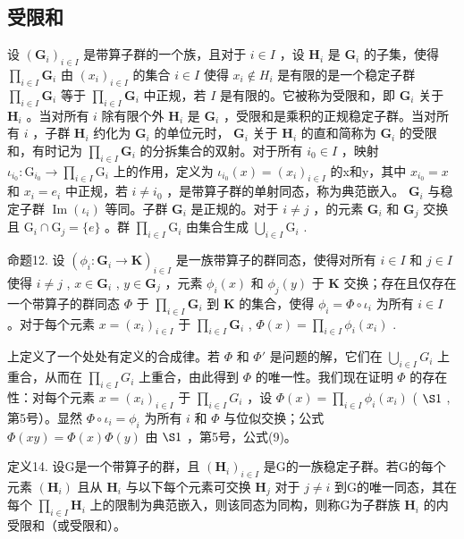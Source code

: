 \subsection{受限和}

设 \((\mathbf{G}_i)_{i\in I}\) 是带算子群的一个族，且对于 \(i\in I\) ，设 \(\mathbf{H}_i\) 是 \(\mathbf{G}_i\) 的子集，使得 \(\prod_{i\in I}\mathbf{G}_i\) 由 \((x_i)_{i\in I}\) 的集合 \(i\in I\) 使得 \(x_i\notin H_i\) 是有限的是一个稳定子群 \(\prod_{i\in I}\mathbf{G}_i\) 等于 \(\prod_{i\in I}\mathbf{G}_i\) 中正规，若 \(I\) 是有限的。它被称为受限和，即 \(\mathbf{G}_i\) 关于 \(\mathbf{H}_i\) 。当对所有 \(i\) 除有限个外 \(\mathbf{H}_i\) 是 \(\mathbf{G}_i\) ，受限和是乘积的正规稳定子群。当对所有 \(i\) ，子群 \(\mathbf{H}_i\) 约化为 \(\mathbf{G}_i\) 的单位元时， \(\mathbf{G}_i\) 关于 \(\mathbf{H}_i\) 的直和简称为 \(\mathbf{G}_i\) 的受限和，有时记为 \(\prod_{i\in I}\mathbf{G}_i\) 的分拆集合的双射。对于所有 \(i_0\in I\) ，映射 \(\iota_{i_0}:\mathrm{G}_{i_0}\to \prod_{i\in I}\mathrm{G}_i\) 上的作用，定义为 \(\iota_{i_0}(x) = (x_i)_{i\in I}\) 的x和y，其中 \(x_{i_0} = x\) 和 \(x_i = e_i\) 中正规，若 \(i\neq i_0\) ，是带算子群的单射同态，称为典范嵌入。 \(\mathbf{G}_i\) 与稳定子群 \(\operatorname {Im}(\iota_i)\) 等同。子群 \(\mathbf{G}_i\) 是正规的。对于 \(i\neq j\) ，的元素 \(\mathbf{G}_i\) 和 \(\mathbf{G}_j\) 交换且 \(\mathrm{G}_i\cap \mathrm{G}_j = \{e\}\) 。群 \(\prod_{i\in I}\mathrm{G}_i\) 由集合生成 \(\bigcup_{i\in I}\mathrm{G}_i\) .

命题12. 设 \((\phi_i: \mathbf{G}_i \to \mathbf{K})_{i \in I}\) 是一族带算子的群同态，使得对所有 \(i \in I\) 和 \(j \in I\) 使得 \(i \neq j\) , \(x \in \mathbf{G}_i\) , \(y \in \mathbf{G}_j\) ，元素 \(\phi_i(x)\) 和 \(\phi_j(y)\) 于 \(\mathbf{K}\) 交换；存在且仅存在一个带算子的群同态 \(\Phi\) 于 \(\prod_{i \in I} \mathbf{G}_i\) 到 \(\mathbf{K}\) 的集合，使得 \(\phi_i = \Phi \circ \iota_i\) 为所有 \(i \in I\) 。对于每个元素 \(x = (x_i)_{i \in I}\) 于 \(\prod_{i \in I} \mathbf{G}_i\) , \(\Phi(x) = \prod_{i \in I} \phi_i(x_i)\) .

上定义了一个处处有定义的合成律。若 \(\Phi\) 和 \(\Phi'\) 是问题的解，它们在 \(\bigcup_{i\in I}G_i\) 上重合，从而在 \(\prod_{i\in I}G_i\) 上重合，由此得到 \(\Phi\) 的唯一性。我们现在证明 \(\Phi\) 的存在性：对每个元素 \(x = (x_i)_{i\in I}\) 于 \(\prod_{i\in I}G_i\) ，设 \(\Phi(x) = \prod_{i\in I}\phi_i(x_i)\) ( \(\S 1\) , 第5号）。显然 \(\Phi \circ \iota_i = \phi_i\) 为所有 \(i\) 和 \(\Phi\) 与位似交换；公式 \(\Phi(xy) = \Phi(x)\Phi(y)\) 由 \(\S 1\) ，第5号，公式(9)。

定义14. 设G是一个带算子的群，且 \((\mathbf{H}_i)_{i\in I}\) 是G的一族稳定子群。若G的每个元素 \((\mathbf{H}_i)\) 且从 \(\mathbf{H}_i\) 与以下每个元素可交换 \(\mathbf{H}_j\) 对于 \(j\neq i\) 到G的唯一同态，其在每个 \(\prod_{i\in I}\mathbf{H}_i\) 上的限制为典范嵌入，则该同态为同构，则称G为子群族 \(\mathbf{H}_i\) 的内受限和（或受限和）。

